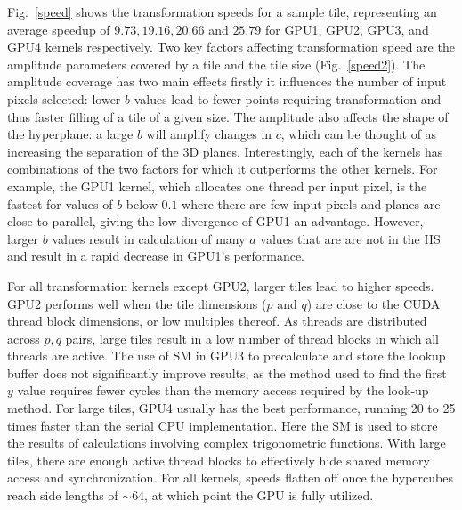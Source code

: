 Fig.~\ref{speed} shows the transformation speeds for a sample tile, representing an average speedup of $9.73, 19.16, 20.66$ and $25.79$ for GPU1, GPU2, GPU3, and GPU4  kernels respectively. Two key factors affecting transformation speed are the amplitude parameters covered by a tile and the tile size (Fig.~\ref{speed2}). The amplitude coverage has two main effects firstly it influences the number of input pixels selected: lower $b$ values lead to fewer points requiring transformation and thus faster filling of a tile of a given size. The amplitude also affects the shape of the hyperplane: a large $b$ will amplify changes in $c$, which can be thought of as increasing the separation of the 3D planes. Interestingly, each of the kernels has combinations of the two factors for which it outperforms the other kernels. For example, the GPU1 kernel, which allocates one thread per input pixel, is the fastest for values of $b$ below $0.1$ where there are few input pixels and planes are close to parallel, giving the low divergence of GPU1 an advantage. However, larger $b$ values result in  calculation of many $a$ values that are are not in the HS and result in a rapid decrease in GPU1's performance.

For all transformation kernels except GPU2, larger tiles lead to higher speeds. GPU2 performs well when the tile dimensions ($p$ and $q$) are close to the CUDA thread block dimensions, or low multiples thereof. As threads are distributed across $p,q$ pairs, large tiles result in a low number of thread blocks in which all threads are active. The use of SM in GPU3 to precalculate and store the lookup buffer does not significantly improve results, as the method used to find the first $y$ value requires fewer cycles than the memory access required by the look-up method. For large tiles, GPU4 usually has the best performance, running  20 to 25 times faster than the serial CPU implementation. Here the SM is used to store the results of calculations involving complex trigonometric functions. With large tiles, there are enough active thread blocks to effectively hide shared memory access and synchronization. For all kernels, speeds flatten off once the hypercubes reach side lengths of $\sim$64, at which point the GPU is fully utilized.

